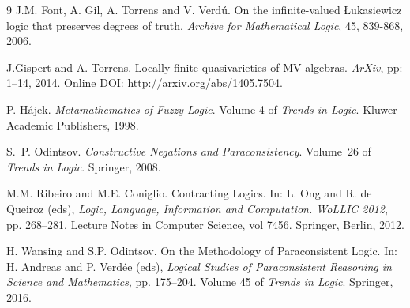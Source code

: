 \documentclass{article}
\theoremstyle{definition}
\begin{document}
\begin{thebibliography}{9}
 J.M. Font, A. Gil, A. Torrens and V. Verd\'u. On the infinite-valued {\L}ukasiewicz logic that
preserves degrees of truth. {\em Archive for Mathematical Logic}, 45, 839-868, 2006.


J.Gispert and A. Torrens.  Locally finite quasivarieties of {MV}-algebras.
{\em ArXiv}, pp: 1--14, 2014. Online DOI: http://arxiv.org/abs/1405.7504.

 {P. H\'ajek}. {\em Metamathematics of Fuzzy Logic}. Volume 4 of {\em Trends in Logic}. Kluwer Academic Publishers, 1998.

S.~P. Odintsov.
{\em Constructive Negations and Paraconsistency}. Volume~26 of {\em
  Trends in Logic}. Springer, 2008.


 M.M. Ribeiro and M.E. Coniglio. Contracting Logics. In: L. Ong and R. de Queiroz (eds), {\em Logic, Language, Information and Computation. WoLLIC 2012}, pp. 268--281. Lecture Notes in Computer Science, vol 7456. Springer, Berlin,  2012.

 H. Wansing and S.P. Odintsov.
On the Methodology of Paraconsistent Logic. In: H. Andreas and P. Verd\'ee (eds), {\em Logical Studies of Paraconsistent Reasoning in Science and Mathematics}, pp. 175--204. Volume 45 of {\em Trends in Logic}. Springer, 2016.


\end{thebibliography}
\end{document}
